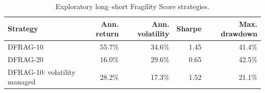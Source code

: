 \begin{table}[!htbp]
\centering
\footnotesize
\caption{Exploratory long--short Fragility Score strategies.}
\label{tab:long-short-performance}
\begin{tabular}{lrrrr}
\toprule
Strategy & Ann. return & Ann. volatility & Sharpe & Max. drawdown \\
\midrule
DFRAG-10 & 55.7\% & 34.6\% & 1.45 & 41.4\% \\
DFRAG-20 & 16.0\% & 29.6\% & 0.65 & 42.5\% \\
DFRAG-10: volatility managed & 28.2\% & 17.3\% & 1.52 & 21.1\% \\
\bottomrule
\end{tabular}
\end{table}
